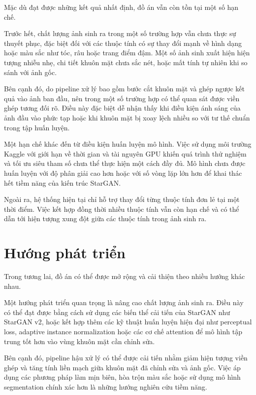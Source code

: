 \documentclass[../DoAn.tex]{subfiles}
\begin{document}
Mặc dù đạt được những kết quả nhất định, đồ án vẫn còn tồn tại một số hạn chế.

Trước hết, chất lượng ảnh sinh ra trong một số trường hợp vẫn chưa thực sự thuyết phục, đặc biệt đối với các thuộc tính có sự thay đổi mạnh về hình dạng hoặc màu sắc như tóc, râu hoặc trang điểm đậm. Một số ảnh sinh xuất hiện hiện tượng nhiễu nhẹ, chi tiết khuôn mặt chưa sắc nét, hoặc mất tính tự nhiên khi so sánh với ảnh gốc.

Bên cạnh đó, do pipeline xử lý bao gồm bước cắt khuôn mặt và ghép ngược kết quả vào ảnh ban đầu, nên trong một số trường hợp có thể quan sát được viền ghép tương đối rõ. Điều này đặc biệt dễ nhận thấy khi điều kiện ánh sáng của ảnh đầu vào phức tạp hoặc khi khuôn mặt bị xoay lệch nhiều so với tư thế chuẩn trong tập huấn luyện.

Một hạn chế khác đến từ điều kiện huấn luyện mô hình. Việc sử dụng môi trường Kaggle với giới hạn về thời gian và tài nguyên GPU khiến quá trình thử nghiệm và tối ưu siêu tham số chưa thể thực hiện một cách đầy đủ. Mô hình chưa được huấn luyện với độ phân giải cao hơn hoặc với số vòng lặp lớn hơn để khai thác hết tiềm năng của kiến trúc StarGAN.

Ngoài ra, hệ thống hiện tại chỉ hỗ trợ thay đổi từng thuộc tính đơn lẻ tại một thời điểm. Việc kết hợp đồng thời nhiều thuộc tính vẫn còn hạn chế và có thể dẫn tới hiện tượng xung đột giữa các thuộc tính trong ảnh sinh ra.

\section{Hướng phát triển}
\label{section:7.3}

Trong tương lai, đồ án có thể được mở rộng và cải thiện theo nhiều hướng khác nhau.

Một hướng phát triển quan trọng là nâng cao chất lượng ảnh sinh ra. Điều này có thể đạt được bằng cách sử dụng các biến thể cải tiến của StarGAN như StarGAN v2, hoặc kết hợp thêm các kỹ thuật huấn luyện hiện đại như perceptual loss, adaptive instance normalization hoặc các cơ chế attention để mô hình tập trung tốt hơn vào vùng khuôn mặt cần chỉnh sửa.

Bên cạnh đó, pipeline hậu xử lý có thể được cải tiến nhằm giảm hiện tượng viền ghép và tăng tính liền mạch giữa khuôn mặt đã chỉnh sửa và ảnh gốc. Việc áp dụng các phương pháp làm mịn biên, hòa trộn màu sắc hoặc sử dụng mô hình segmentation chính xác hơn là những hướng nghiên cứu tiềm năng.
\end{document}
